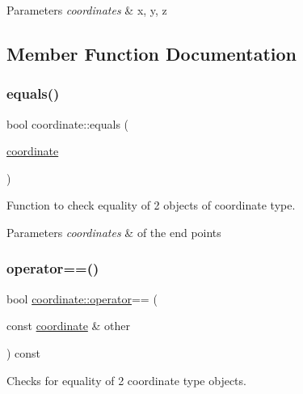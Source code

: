 \begin{DoxyParams}{Parameters}
{\em coordinates} & x, y, z \\
\hline
\end{DoxyParams}


\subsection{Member Function Documentation}
\mbox{\label{structcoordinate_a0fec3cedeb21f6cefc564449a409fc57}} 
\subsubsection{\texorpdfstring{equals()}{equals()}}
{\footnotesize\ttfamily bool coordinate\+::equals (\begin{DoxyParamCaption}\item[{\mbox{\hyperlink{structcoordinate}{coordinate}}}]{ }\end{DoxyParamCaption})}



Function to check equality of 2 objects of coordinate type. 


\begin{DoxyParams}{Parameters}
{\em coordinates} & of the end points \\
\hline
\end{DoxyParams}
\mbox{\label{structcoordinate_aa137ae8aeb3a4ceee25e595ae6a2428f}} 
\subsubsection{\texorpdfstring{operator==()}{operator==()}}
{\footnotesize\ttfamily bool \mbox{\hyperlink{objects_8h_afc5adb2920a8566a6c3f0402a87d1027}{coordinate\+::operator}}== (\begin{DoxyParamCaption}\item[{const \mbox{\hyperlink{structcoordinate}{coordinate}} \&}]{other }\end{DoxyParamCaption}) const\hspace{0.3cm}{\ttfamily [inline]}}



Checks for equality of 2 coordinate type objects. 


